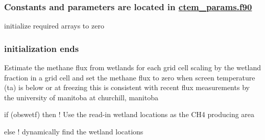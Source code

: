  \subsubsection*{Constants and parameters are located in \hyperlink{ctem__params_8f90}{ctem\+\_\+params.\+f90} }

initialize required arrays to zero

\subsubsection*{initialization ends }

Estimate the methane flux from wetlands for each grid cell scaling by the wetland fraction in a grid cell and set the methane flux to zero when screen temperature (ta) is below or at freezing this is consistent with recent flux measurements by the university of manitoba at churchill, manitoba

if (obswetf) then ! Use the read-\/in wetland locations as the C\+H4 producing area

else ! dynamically find the wetland locations